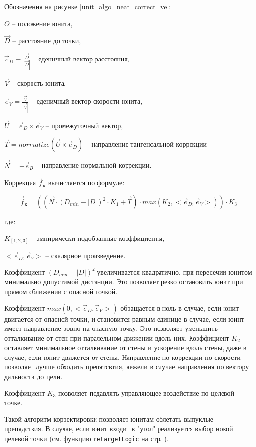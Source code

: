 Обозначения на рисунке \ref{unit_algo_near_correct_ve}:

$O$ -- положение юнита,

$\vec D$ -- расстояние до точки,

$\vec e_D = \frac{\vec D}{|\vec D|}$ -- еденичный вектор расстояния,

$\vec V$ -- скорость юнита,

$\vec e_V = \frac{\vec V}{|\vec V|}$ -- еденичный вектор скорости юнита,

$\vec U = \vec e_D \times \vec e_V$ -- промежуточный вектор,

$\vec T = normalize(\vec U \times \vec e_D)$ -- направление тангенсальной коррекции

$\vec N = -\vec e_D$ -- направление нормальной коррекции.

Коррекция $\vec f_{\text{к}}$ вычисляется по формуле:

$$\vec f_{\text{к}} = ( ( \vec N \cdot ( D_{min} - |D| )^2 \cdot K_1 + \vec T ) \cdot max( K_2, < \vec e_D, \vec e_V > ) ) \cdot K_3 $$

где:

$K_{[1,2,3]}$ -- эмпирически подобранные коэффициенты, 

$< \vec e_D, \vec e_V >$ -- скалярное произведение.

Коэффициент $(D_{min} - |D|)^2$ увеличивается квадратично,
при пересечии юнитом минимально допустимой дистанции. Это позволяет
резко остановить юнит при прямом сближении с опасной точкой.

Коэффициент $max(0, < \vec e_D, \vec e_V > )$ обращается в ноль в случае,
если юнит двигается от опасной точки, и становится равным единице в случае,
если юинт имеет направление ровно на опасную точку. Это позволяет уменьшить
отталкивание от стен при паралельном движении вдоль них. Коэффициент $K_2$ оставляет
минимальное отталкивание от стены и ускорение вдоль стены, даже в случае, если
юнит движется от стены. Направление по коррекции по скорости позволяет лучше
обходить препятсвтия, нежели в случае направления по вектору дальности до цели.

Коэффициент $K_3$ позволяет подавлять управляющее воздействие по целевой \lb точке.

Такой алгоритм корректировки позволяет юнитам облетать выпуклые препядствия.
В случае, если юнит входит в "угол" реализуется выбор новой целевой точки
(см. функцию \verb|retargetLogic| на стр. \pageref{ref:unit_algo_retarget}).
